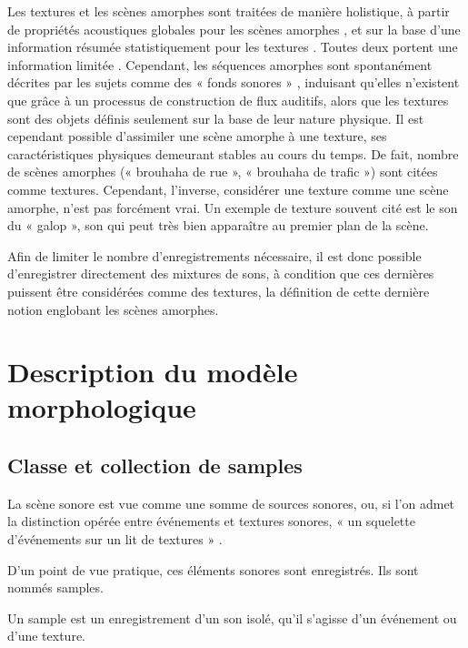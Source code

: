 Les textures et les scènes amorphes sont traitées de manière holistique, à partir de propriétés acoustiques globales pour les scènes amorphes \citep{dubois2006cognitive,maffiolo_caracterisation_1999}, et sur la base d'une information résumée statistiquement pour les textures \citep{mcdermott2013summary}. Toutes deux portent une information limitée \citep{saint1995classification,nelken2013ear}. Cependant, les séquences amorphes sont spontanément décrites par les sujets comme des « fonds sonores » \citep{maffiolo_caracterisation_1999,guastavino2006ideal}, induisant qu'elles n'existent que grâce à un processus de construction de flux auditifs, alors que les textures sont des objets définis seulement sur la base de leur nature physique. Il est cependant possible d'assimiler une scène amorphe à une texture, ses caractéristiques physiques demeurant stables au cours du temps. De fait, nombre de scènes amorphes (« brouhaha de rue », « brouhaha de trafic ») sont citées comme textures. Cependant, l'inverse, considérer une texture comme une scène amorphe, n'est pas forcément vrai.
Un exemple de texture souvent cité est le son du « galop », son qui peut très bien apparaître au premier plan de la scène.

Afin de limiter le nombre d'enregistrements nécessaire, il est donc possible d'enregistrer directement des mixtures de sons, à condition que ces dernières puissent être considérées comme des textures, la définition de cette dernière notion englobant les scènes amorphes. 

\section{Description du modèle morphologique}
\label{sec:ch4_modelDes}

\subsection{Classe et collection de samples}
\label{sec:ch4_collecSons}

La scène sonore est vue comme une somme de sources sonores, ou, si l'on admet la distinction opérée entre événements et textures sonores, « un squelette d'événements sur un lit de textures » \citep{nelken2013ear}. 

D'un point de vue pratique, ces éléments sonores sont enregistrés. Ils sont nommés samples.
 
\begin{mydef}
Un sample est un enregistrement d'un son isolé, qu'il s'agisse d'un événement ou d'une texture.
\end{mydef}

